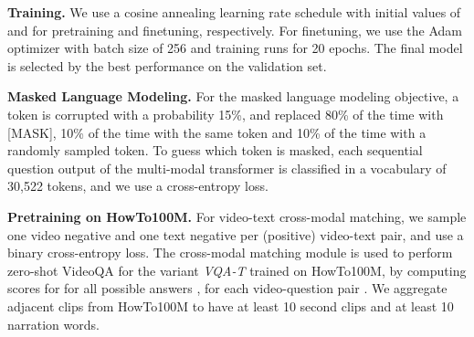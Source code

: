 \begin{table}[t]
\begin{center}
\setlength\tabcolsep{4pt}
\end{center}
\vspace{-0.5cm}
\caption{\small Comparison of \textit{\qat{}} and \textit{\vqat{}} models trained from scratch (without pretraining) on downstream datasets.}
\vspace{-0.3cm}
\label{table:bias}
\end{table} 

\noindent \textbf{Training.} We use a cosine annealing learning rate schedule with initial values of  and  for pretraining and finetuning, respectively. For finetuning, we use the Adam optimizer with batch size of 256 and training runs for 20 epochs. The final model is selected by the best performance on the validation set.

\noindent \textbf{Masked Language Modeling.} For the masked language modeling objective, a token is corrupted with a probability 15\%, and replaced 80\% of the time with [MASK], 10\% of the time with the same token and 10\% of the time with a randomly sampled token. 
To guess which token is masked, each sequential question output  of the multi-modal transformer is classified in a vocabulary of 30,522 tokens, and we use a cross-entropy loss.


\noindent \textbf{Pretraining on HowTo100M.} For video-text cross-modal matching, we sample one video negative and one text negative per (positive) video-text pair, and use a binary cross-entropy loss. 
The cross-modal matching module is used to perform zero-shot VideoQA for the variant \textit{VQA-T} trained on HowTo100M, by computing scores for  for all possible answers , for each video-question pair .
We aggregate adjacent clips from HowTo100M to have at least 10 second clips and at least 10 narration words. 



